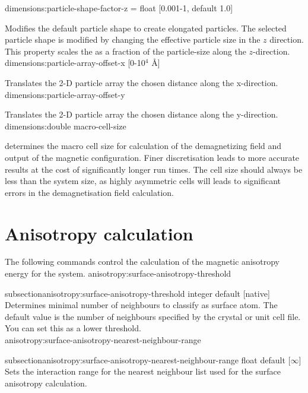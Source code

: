 {\zicf dimensions:particle-shape-factor-z = float [0.001-1, default 1.0]} Modifies the default particle shape to create elongated particles. The selected particle shape is modified by changing the effective particle size in the $z$ direction. This property scales the as a fraction of the particle-size along the $z$-direction.\\

{\zicf dimensions:particle-array-offset-x [0-10$^4$ \AA]} Translates the 2-D particle array the chosen distance along the x-direction.\\

{\zicf dimensions:particle-array-offset-y}  Translates the 2-D particle array the chosen distance along the y-direction.\\

{\zicf dimensions:double macro-cell-size} determines the macro cell size for calculation of the demagnetizing field and output of the magnetic configuration. Finer discretisation leads to more accurate results at the cost of significantly longer run times. The cell size should always be less than the system size, as highly asymmetric cells will leads to significant errors in the demagnetisation field calculation.

\section*{Anisotropy calculation}
The following commands control the calculation of the magnetic anisotropy energy for the system.
{\zicf anisotropy:surface-anisotropy-threshold}
{subsection}{anisotropy:surface-anisotropy-threshold}
  integer default [native]
  Determines minimal number of neighbours to classify as surface atom. The
  default value is the number of neighbours specified by the crystal or unit cell
  file. You can set this as a lower threshold. \\

{\zicf anisotropy:surface-anisotropy-nearest-neighbour-range}
{subsection}{anisotropy:surface-anisotropy-nearest-neighbour-range}
  float default [$\infty$]
  Sets the interaction range for the nearest neighbour list used for the surface
  anisotropy calculation.\\

